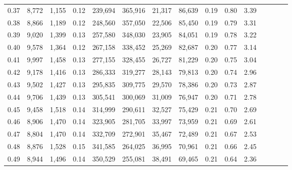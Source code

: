 \begin{tabular}{rrrcrrrrrrrrrrr}
0.37 &   8,772 &  1,155 &                                       0.12 &  239,694 &  365,916 &   21,317 &   86,639 &  0.19 &  0.80 &                         3.39 \\
0.38 &   8,866 &  1,189 &                                       0.12 &  248,560 &  357,050 &   22,506 &   85,450 &  0.19 &  0.79 &                         3.31 \\
0.39 &   9,020 &  1,399 &                                       0.13 &  257,580 &  348,030 &   23,905 &   84,051 &  0.19 &  0.78 &                         3.22 \\
0.40 &   9,578 &  1,364 &                                       0.12 &  267,158 &  338,452 &   25,269 &   82,687 &  0.20 &  0.77 &                         3.14 \\
0.41 &   9,997 &  1,458 &                                       0.13 &  277,155 &  328,455 &   26,727 &   81,229 &  0.20 &  0.75 &                         3.04 \\
0.42 &   9,178 &  1,416 &                                       0.13 &  286,333 &  319,277 &   28,143 &   79,813 &  0.20 &  0.74 &                         2.96 \\
0.43 &   9,502 &  1,427 &                                       0.13 &  295,835 &  309,775 &   29,570 &   78,386 &  0.20 &  0.73 &                         2.87 \\
0.44 &   9,706 &  1,439 &                                       0.13 &  305,541 &  300,069 &   31,009 &   76,947 &  0.20 &  0.71 &                         2.78 \\
0.45 &   9,458 &  1,518 &                                       0.14 &  314,999 &  290,611 &   32,527 &   75,429 &  0.21 &  0.70 &                         2.69 \\
0.46 &   8,906 &  1,470 &                                       0.14 &  323,905 &  281,705 &   33,997 &   73,959 &  0.21 &  0.69 &                         2.61 \\
0.47 &   8,804 &  1,470 &                                       0.14 &  332,709 &  272,901 &   35,467 &   72,489 &  0.21 &  0.67 &                         2.53 \\
0.48 &   8,876 &  1,528 &                                       0.15 &  341,585 &  264,025 &   36,995 &   70,961 &  0.21 &  0.66 &                         2.45 \\
0.49 &   8,944 &  1,496 &                                       0.14 &  350,529 &  255,081 &   38,491 &   69,465 &  0.21 &  0.64 &                         2.36 \\

\end{tabular}
